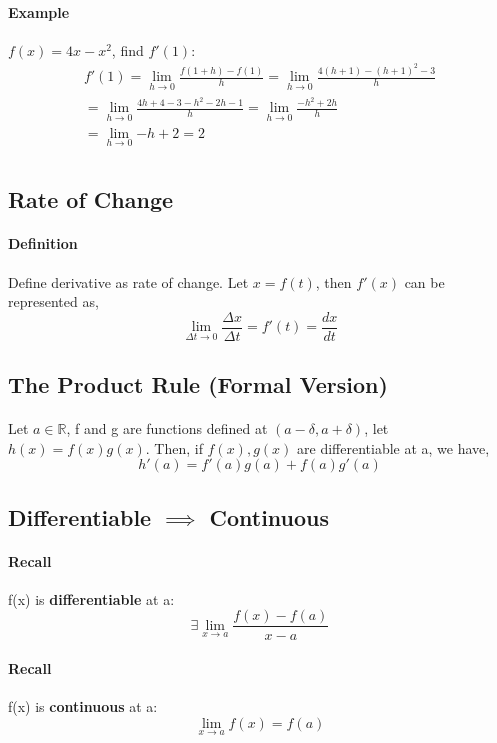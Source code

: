 \documentclass{article}
\begin{document}
	\paragraph{Example} $f(x) = 4x - x^2$, find $f'(1)$:
	\begin{align*}
		f'(1) = \lim_{h \to 0}\frac{f(1 + h) - f(1)}{h} = \lim_{h \to 0}\frac{4(h+1) - (h+1)^2 - 3}{h}\\
		= \lim_{h \to 0}\frac{4h+4-3-h^2-2h-1}{h} = \lim_{h \to 0}\frac{-h^2 + 2h}{h} \\
		= \lim_{h \to 0}{-h + 2} = 2 \\
	\end{align*}
	\subsection{Rate of Change}
	\paragraph{Definition} Define derivative as rate of change. Let $x=f(t)$, then $f'(x)$ can be represented as,
	\[
	\lim_{\Delta t \to 0}\frac{\Delta x}{\Delta t} = f'(t) = \frac{dx}{dt}
	\]
	\subsection{The Product Rule (Formal Version)}
	\paragraph{} Let $a \in \mathbb{R}$, f and g are functions defined at $(a - \delta,a+\delta)$, let $h(x) = f(x)g(x)$. Then, if $f(x),g(x)$ are differentiable at a, we have,
	\[
	h'(a) = f'(a)g(a) + f(a)g'(a)
	\]
	\subsection{Differentiable $\implies$ Continuous}
	\paragraph{Recall} f(x) is \textbf{differentiable} at a:
	\begin{equation}
		\exists \lim_{x \to a}\frac{f(x) - f(a)}{x - a}
	\end{equation}
	\paragraph{Recall} f(x) is \textbf{continuous} at a:
	\begin{equation}
		\lim_{x \to a}f(x) = f(a)
	\end{equation}
\end{document}
